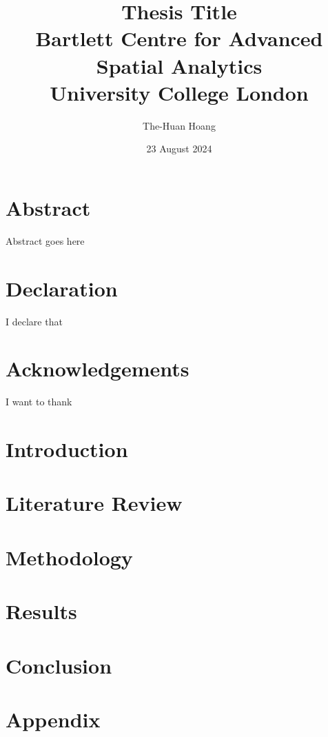 \documentclass[12pt]{report}
\title{
{Thesis Title}\\
{\large Bartlett Centre for Advanced Spatial Analytics}\\
{\large University College London}\\
}
\author{The-Huan Hoang}
\date{23 August 2024}
\begin{document}
\maketitle

\chapter*{Abstract}
Abstract goes here

\chapter*{Declaration}
I declare that

\chapter*{Acknowledgements}
I want to thank

\tableofcontents

\chapter{Introduction}


\chapter{Literature Review}


\chapter{Methodology}


\chapter{Results}


\chapter{Conclusion}


\appendix
\chapter{Appendix}

\end{document}
